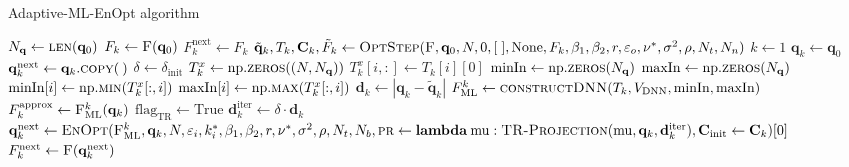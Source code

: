 \begin{algorithm}[H]%
\caption{\label{AML-EnOpt}Adaptive-ML-EnOpt algorithm}
\begin{algorithmic}[1]
\State $N_\mathbf{q}\gets\Call{len}{\mathbf{q}_0}$
\State $F_k\gets \Call{F}{\mathbf{q}_0}$
\State $F^\mathrm{next}_k \gets F_k$
\State\label{FOMOptStepAML1} $\tilde{\mathbf{q}}_k,T_k,\mathbf{C}_k,\tilde{F}_k\gets\Call{OptStep}{\textproc{F}, \mathbf{q}_0, N, 0, [\;], \mathrm{None}, F_k, \beta_1, \beta_2, r, \varepsilon_o, \nu^*, \sigma^2, \rho, N_t, N_n}$
\State $k\gets 1$
\State $\mathbf{q}_k \gets \mathbf{q}_0$
\State $\mathbf{q}^\mathrm{next}_k \gets \mathbf{q}_k.\Call{copy}{\:}$
\State\label{deltaInitAML} $\delta \gets \delta_\mathrm{init}$
\State\label{minMaxInAlg1} $T^x_k \gets \mathrm{np.}\Call{zeros}{(N, N_\mathbf{q})}$
\State $T^x_k[i,:] \gets T_k[i][0]$
\EndFor
\State $\mathrm{minIn} \gets \mathrm{np.}\Call{zeros}{N_\mathbf{q}}$
\State $\mathrm{maxIn} \gets \mathrm{np.}\Call{zeros}{N_\mathbf{q}}$
\State $\mathrm{minIn}[i] \gets \mathrm{np.}\Call{min}{T^x_k[:,i]}$
\State\label{minMaxInAlg2} $\mathrm{maxIn}[i] \gets \mathrm{np.}\Call{max}{T^x_k[:,i]}$
\EndFor
\State\label{d_kDefAML} $\mathbf{d}_k\gets|\mathbf{q}_k-\tilde{\mathbf{q}}_k|$
\State\label{surrogateDefAML} $F_\mathrm{ML}^k\gets \Call{constructDNN}{T_k, V_\mathrm{DNN}, \mathrm{minIn}, \mathrm{maxIn}}$
\State $F^\mathrm{approx}_k\gets \Call{F$_\mathrm{ML}^k$}{\mathbf{q}_k}$
\State $\mathrm{flag}_\mathrm{TR}\gets \mathrm{True}$
\State $\mathbf{d}^\mathrm{iter}_k\gets\delta\cdot\mathbf{d}_k$
\State $\mathbf{q}^\mathrm{next}_k\gets\Call{EnOpt}{\textproc{F$_\mathrm{ML}^k$},\mathbf{q}_k,N,\varepsilon_i,k_i^*,\beta_1, \beta_2,r,\nu^*, \sigma^2, \rho, N_t, N_b, \textproc{pr}\gets\mathbf{lambda}\:\mathrm{mu}:\protect\Call{TR-Projection}{\mathrm{mu}, \mathbf{q}_k, \mathbf{d}^\mathrm{iter}_k}, \mathbf{C}_\mathrm{init}\gets\mathbf{C}_k}[0]$
\State $F^\mathrm{next}_k\gets \Call{F}{\mathbf{q}^\mathrm{next}_k}$

\end{algorithmic}
\end{algorithm}
